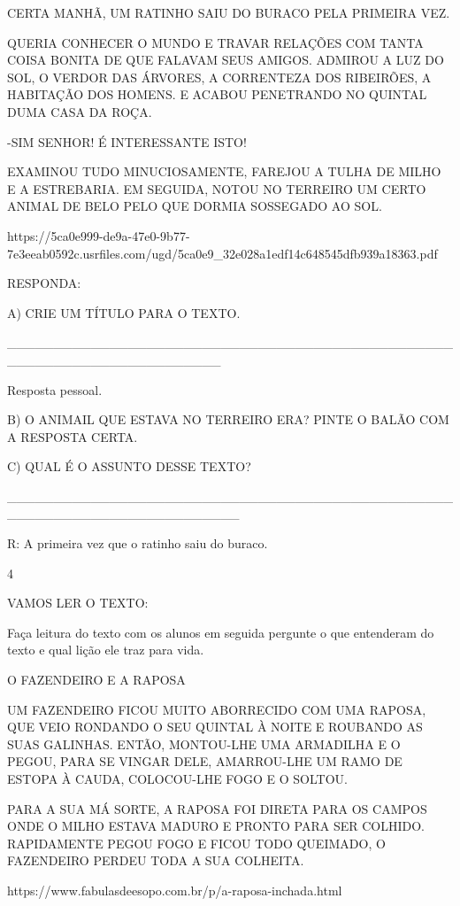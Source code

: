 {{{{{CERTA MANHÃ, UM RATINHO SAIU DO BURACO PELA PRIMEIRA VEZ.

QUERIA CONHECER O MUNDO E TRAVAR RELAÇÕES COM TANTA COISA BONITA DE QUE
FALAVAM SEUS AMIGOS. ADMIROU A LUZ DO SOL, O VERDOR DAS ÁRVORES, A
CORRENTEZA DOS RIBEIRÕES, A HABITAÇÃO DOS HOMENS. E ACABOU PENETRANDO NO
QUINTAL DUMA CASA DA ROÇA.

-SIM SENHOR! É INTERESSANTE ISTO!

EXAMINOU TUDO MINUCIOSAMENTE, FAREJOU A TULHA DE MILHO E A ESTREBARIA.
EM SEGUIDA, NOTOU NO TERREIRO UM CERTO ANIMAL DE BELO PELO QUE DORMIA
SOSSEGADO AO SOL.

https://5ca0e999-de9a-47e0-9b77-7e3eeab0592c.usrfiles.com/ugd/5ca0e9\_32e028a1edf14c648545dfb939a18363.pdf

RESPONDA:

A) CRIE UM TÍTULO PARA O TEXTO.

\_\_\_\_\_\_\_\_\_\_\_\_\_\_\_\_\_\_\_\_\_\_\_\_\_\_\_\_\_\_\_\_\_\_\_\_\_\_\_\_\_\_\_\_\_\_\_\_\_\_\_\_\_\_\_\_\_\_\_\_\_\_\_\_\_\_\_\_\_\_\_

Resposta pessoal.

B) O ANIMAIL QUE ESTAVA NO TERREIRO ERA? PINTE O BALÃO COM A RESPOSTA
CERTA.

C) QUAL É O ASSUNTO DESSE TEXTO?

\_\_\_\_\_\_\_\_\_\_\_\_\_\_\_\_\_\_\_\_\_\_\_\_\_\_\_\_\_\_\_\_\_\_\_\_\_\_\_\_\_\_\_\_\_\_\_\_\_\_\_\_\_\_\_\_\_\_\_\_\_\_\_\_\_\_\_\_\_\_\_\_\_

R: A primeira vez que o ratinho saiu do buraco.

\num{4}

VAMOS LER O TEXTO:

Faça leitura do texto com os alunos em seguida pergunte o que entenderam
do texto e qual lição ele traz para vida.

O FAZENDEIRO E A RAPOSA

UM FAZENDEIRO FICOU MUITO ABORRECIDO COM UMA RAPOSA, QUE VEIO RONDANDO O
SEU QUINTAL À NOITE E ROUBANDO AS SUAS GALINHAS. ENTÃO, MONTOU-LHE UMA
ARMADILHA E O PEGOU, PARA SE VINGAR DELE, AMARROU-LHE UM RAMO DE ESTOPA
À CAUDA, COLOCOU-LHE FOGO E O SOLTOU.

PARA A SUA MÁ SORTE, A RAPOSA FOI DIRETA PARA OS CAMPOS ONDE O MILHO
ESTAVA MADURO E PRONTO PARA SER COLHIDO. RAPIDAMENTE PEGOU FOGO E FICOU
TODO QUEIMADO, O FAZENDEIRO PERDEU TODA A SUA COLHEITA.

https://www.fabulasdeesopo.com.br/p/a-raposa-inchada.html

}}}}}
